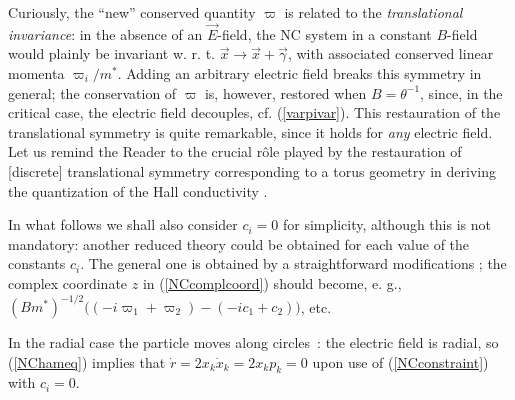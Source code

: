 \documentclass[a4paper,11pt]{article}
\newcommand{\vx}{{\vec x}}
\def\vgamma{{\vec\gamma}}
\def\vE{{\vec E}}
\def\vx{{\vec x}}
\def\vE{{\vec E}}
\begin{document}
Curiously, the ``new'' conserved quantity
$\varpi$ is related to the {\it translational invariance}:
in the absence of an $\vE$-field, the NC system in a constant
$B$-field would plainly be
invariant w. r. t. $\vx\to \vx+\vgamma$,
with associated conserved linear momenta $\varpi_{i}/m^*$.
Adding an arbitrary electric field
breaks this symmetry in general;
the conservation of $\varpi$ is, however,
restored when $B=\theta^{-1}$, since, in the critical case,
the electric field decouples, cf. (\ref{varpivar}).
This restauration of the translational symmetry is quite remarkable,
since it holds for {\it any} electric field.
Let us remind the Reader to the crucial r\^ole played by
the restauration
of [discrete] translational symmetry corresponding to a torus
geometry in deriving the quantization of the
Hall conductivity \cite{QHE}.

In what follows we shall also consider $c_{i}=0$
for simplicity, although this is not mandatory: another
  reduced theory could be obtained for each value of
the constants $c_{i}$.
The general one is obtained by a straightforward
modifications ; the complex coordinate $z$ in
(\ref{NCcomplcoord})  should become, e. g.,
$(Bm^*)^{-1/2}
\Big((-i\varpi_{1}+\varpi_{2})-(-ic_{1}+c_{2})\Big)
$,
etc.

In the radial case  the particle moves along circles~:
the electric field is radial, so (\ref{NChameq}) implies that
$
\dot{r}=2x_{k}\dot{x}_{k}=2x_{k}p_{k}=0
$
upon use of (\ref{NCconstraint}) with $c_{i}=0$.
\end{document}
